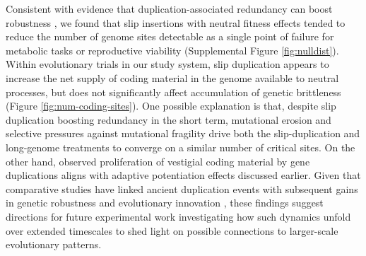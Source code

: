 Consistent with evidence that duplication-associated redundancy can boost robustness \citep{Lynch2000}, we found that slip insertions with neutral fitness effects tended to reduce the number of genome sites detectable as a single point of failure for metabolic tasks or reproductive viability (Supplemental Figure \ref{fig:nulldist}).
Within evolutionary trials in our study system, slip duplication appears to increase the net supply of coding material in the genome available to neutral processes, but does not significantly affect accumulation of genetic brittleness (Figure \ref{fig:num-coding-sites}).
One possible explanation is that, despite slip duplication boosting redundancy in the short term, mutational erosion and selective pressures against mutational fragility drive both the slip-duplication and long-genome treatments to converge on a similar number of critical sites.
On the other hand, observed proliferation of vestigial coding material by gene duplications aligns with adaptive potentiation effects discussed earlier.
Given that comparative studies have linked ancient duplication events with subsequent gains in genetic robustness and evolutionary innovation \citep{Wagner2008}, these findings suggest directions for future experimental work investigating how such dynamics unfold over extended timescales to shed light on possible connections to larger-scale evolutionary patterns.
